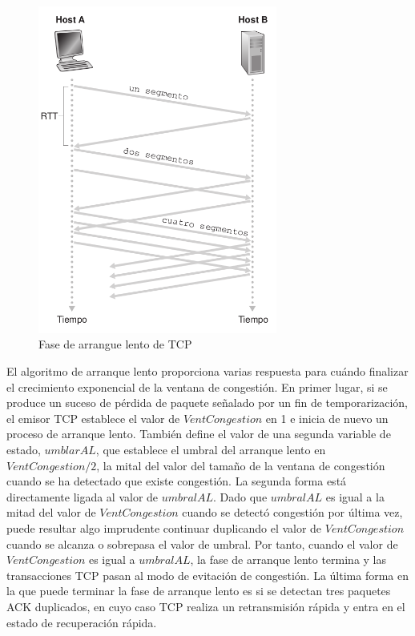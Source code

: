 \documentclass[a4paper,11pt]{article}
\begin{document}
\begin{figure}[h]
\centering
\caption{Fase de arrangue lento de TCP}
\includegraphics[scale=1,width=0.7\textwidth]{arranque_lento.png}
\end{figure}

El algoritmo de arranque lento proporciona varias respuesta para cuándo finalizar el crecimiento exponencial de la ventana de congestión. En primer lugar, si se produce un suceso de pérdida de paquete señalado por un fin de temporarización, el emisor TCP establece el valor de $VentCongestion$ en 1 e inicia de nuevo un proceso de arranque lento. También define el valor de una segunda variable de estado, $umblarAL$, que establece el umbral del arranque lento en $VentCongestion/2$, la mital del valor del tamaño de la ventana de congestión cuando se ha detectado que existe congestión. La segunda forma está directamente ligada al valor de $umbralAL$. Dado que $umbralAL$ es igual a la mitad del valor de $VentCongestion$ cuando se detectó congestión por última vez, puede resultar algo imprudente continuar duplicando el valor de $VentCongestion$ cuando se alcanza o sobrepasa el valor de umbral. Por tanto, cuando el valor de $VentCongestion$ es igual a $umbralAL$, la fase de arranque lento termina y las transacciones TCP pasan al modo de evitación de congestión. La última forma en la que puede terminar la fase de arranque lento es si se detectan tres paquetes ACK duplicados, en cuyo caso TCP realiza un retransmisión rápida y entra en el estado de recuperación rápida.
\end{document}
